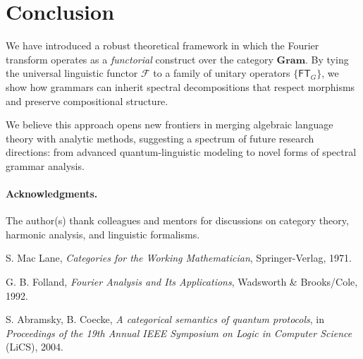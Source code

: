 \documentclass[11pt]{article}
\begin{document}
\section{Conclusion}

We have introduced a robust theoretical framework in which the Fourier transform operates as a \emph{functorial} construct over the category \(\mathbf{Gram}\). By tying the universal linguistic functor \(\mathcal{F}\) to a family of unitary operators \(\{\mathsf{FT}_G\}\), we show how grammars can inherit spectral decompositions that respect morphisms and preserve compositional structure. 

We believe this approach opens new frontiers in merging algebraic language theory with analytic methods, suggesting a spectrum of future research directions: from advanced quantum-linguistic modeling to novel forms of spectral grammar analysis. 

\paragraph{Acknowledgments.} 
The author(s) thank colleagues and mentors for discussions on category theory, harmonic analysis, and linguistic formalisms.


\begin{thebibliography}{9}

S. Mac Lane, 
\textit{Categories for the Working Mathematician}, 
Springer-Verlag, 1971.

G. B. Folland, 
\textit{Fourier Analysis and Its Applications}, 
Wadsworth \& Brooks/Cole, 1992.

S. Abramsky, B. Coecke,
\textit{A categorical semantics of quantum protocols},
in \textit{Proceedings of the 19th Annual IEEE Symposium on Logic in Computer Science} (LiCS), 2004.

\end{thebibliography}
\end{document}
